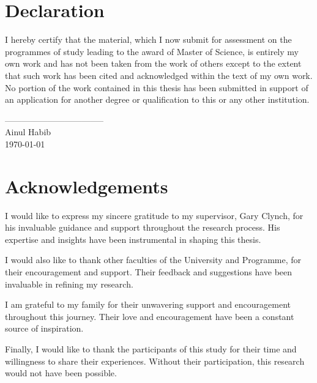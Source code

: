 \documentclass{article}
\begin{document}
\section*{Declaration}
\begin{flushleft}
I hereby certify that the material, which I now submit for assessment on the programmes of study leading to the award of Master of Science, is entirely my own work and has not been taken from the work of others except to the extent that such work has been cited and acknowledged within the text of my own work. No portion of the work contained in this thesis has been submitted in support of an application for another degree or qualification to this or any other institution.
\end{flushleft}
\vspace{2cm}
\begin{flushright}
-----------------------------------\\
Ainul Habib\\
\today
\end{flushright}
\pagebreak

\section*{Acknowledgements}
 
 I would like to express my sincere gratitude to my supervisor, Gary Clynch, for his invaluable guidance and support throughout the research process. His expertise and insights have been instrumental in shaping this thesis.

I would also like to thank other faculties of the University and Programme, for their encouragement and support. Their feedback and suggestions have been invaluable in refining my research.

I am grateful to my family for their unwavering support and encouragement throughout this journey. Their love and encouragement have been a constant source of inspiration.

Finally, I would like to thank the participants of this study for their time and willingness to share their experiences. Without their participation, this research would not have been possible.
\pagebreak

\listoffigures
\pagebreak
 


\tableofcontents
\pagebreak
\end{document}
